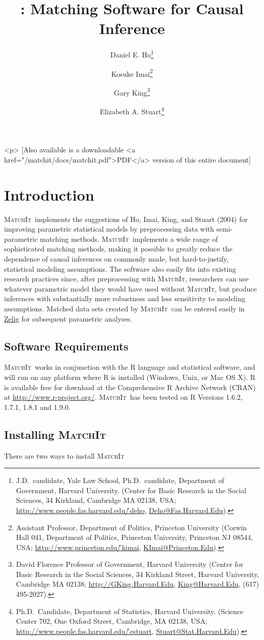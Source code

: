 \documentclass[oneside,letterpaper,titlepage]{article}
\title{\MatchIt : Matching Software for Causal Inference}
\author{Daniel E. Ho\thanks{J.D.\ candidate, Yale Law School, Ph.D.\ 
    candidate, Department of Government, Harvard University. (Center
    for Basic Research in the Social Sciences, 34 Kirkland, Cambridge
    MA 02138, USA;
    \href{http://www.people.fas.harvard.edu/\~deho}{http://www.people.fas.harvard.edu/\~\,deho},
    \href{mailto:Deho@Fas.Harvard.Edu}{Deho@Fas.Harvard.Edu}).}
\and %
Kosuke Imai\thanks{Assistant Professor, Department of Politics, Princeton
    University (Corwin Hall 041, Department of Politics, Princeton
    University, Princeton NJ 08544, USA;
    \href{http://www.princeton.edu/\~kimai}{http://www.princeton.edu/\~\,kimai},
    \href{mailto:KImai@Princeton.Edu}{KImai@Princeton.Edu}).}
\and %
Gary King\thanks{David Florence Professor of Government, Harvard
  University (Center for Basic Research in the Social Sciences, 34
  Kirkland Street, Harvard University, Cambridge MA 02138;
  \href{http://GKing.Harvard.Edu}{http://GKing.Harvard.Edu}, \href{mailto:King@Harvard.Edu}{King@Harvard.Edu}, (617)
  495-2027).}
\and %
Elizabeth A. Stuart\thanks{Ph.D.\ Candidate, Department of Statistics, Harvard
  University. (Science Center 702, One Oxford Street, Cambridge, MA
  02138, USA;
  \href{http://www.people.fas.harvard.edu/\~estuart}{http://www.people.fas.harvard.edu/\~\,estuart},
  \href{mailto:Stuart@Stat.Harvard.Edu}{Stuart@Stat.Harvard.Edu}).}}
\newcommand{\MatchIt}{\textsc{MatchIt}}
\begin{document}
\maketitle

\begin{rawhtml}
<p>
  [Also available is a downloadable <a href="/matchit/docs/matchit.pdf">PDF</a>
  version of this entire document]
\end{rawhtml}

\tableofcontents

\section{Introduction}
\MatchIt\ implements the suggestions of Ho, Imai, King, and Stuart
(2004) for improving parametric statistical models by preprocessing
data with semi-parametric matching methods.  \MatchIt\ implements a wide
range of sophisticated matching methods, making it possible to greatly
reduce the dependence of causal inferences on commonly made, but
hard-to-justify, statistical modeling assumptions.  The software also
easily fits into existing research practices since, after
preprocessing with \MatchIt, researchers can use whatever parametric
model they would have used without \MatchIt, but produce inferences
with substantially more robustness and less sensitivity to modeling
assumptions.  Matched data sets created by \MatchIt\ can be entered
easily in \href{http://gking.harvard.edu/zelig/}{Zelig} for subsequent
parametric analyses.


\subsection{Software Requirements} 
\MatchIt\ works in conjunction with the R language and statistical
software, and will run on any platform where R is installed (Windows,
Unix, or Mac OS X).  R is available free for download at the
Comprehensive R Archive Network (CRAN) at
\href{http://www.r-project.org/}{http://www.r-project.org/}.
\MatchIt\ has been tested on R Versions 1.6.2, 1.7.1, 1.8.1 and
1.9.0.

\subsection{Installing \MatchIt} 

There are two ways to install \MatchIt\: 
\end{document}

